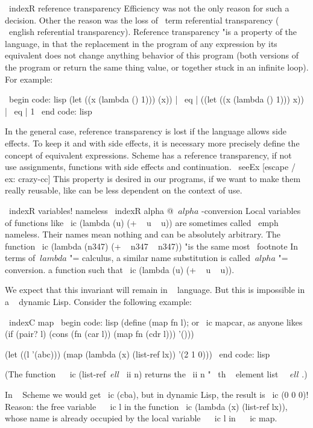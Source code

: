{{\ indexR {reference transparency}
Efficiency was not the only reason for such a decision. Other
the reason was the loss of \ term {referential transparency} ( \ english {referential
transparency}). Reference transparency "is a property of the language,
in that the replacement in the program of any expression by its equivalent does not change anything
behavior of this program (both versions of the program or return the same thing
value, or together stuck in an infinite loop). For example:

\ begin {code: lisp}
(let ((x (lambda () 1))) (x)) | \ eq | ((let ((x (lambda () 1))) x)) | \ eq | 1
\ end {code: lisp}

In the general case, reference transparency is lost if the language allows side
effects. To keep it and with side effects, it is necessary
more precisely define the concept of equivalent expressions. Scheme has a reference
transparency, if not ~ use assignments, functions with side effects
and continuation. \ seeEx [escape / ex: crazy-cc] This property is desired in our
programs, if we want to make them really reusable, like
can be less dependent on the context of use.

\ indexR {variables! nameless}
\ indexR {alpha @ $ \ alpha $ -conversion}
Local variables of functions like \ ic {(lambda (u) (+ ~ u ~ u))} are sometimes called
\ emph {nameless}. Their names mean nothing and can be absolutely
arbitrary. The function \ ic {(lambda (n347) (+ ~ n347 ~ n347))} "is the same
most \ footnote {In terms of $ \ lambda $ "= calculus, a similar name substitution is called
$ \ alpha $ "= conversion.} a function such that \ ic {(lambda (u) (+ ~ u ~ u))}.

We expect that this invariant will remain in ~ language. But this is impossible
in a ~ dynamic Lisp. Consider the following example:

\ indexC {map}
\ begin {code: lisp}
(define (map fn l); or \ ic {mapcar}, as anyone likes
  (if (pair? l)
      (cons (fn (car l)) (map fn (cdr l)))
      '()))

(let ((l '(abc)))
  (map (lambda (x) (list-ref lx))
       '(2 1 0)))
\ end {code: lisp}

(The function ~ \ ic {(list-ref $ \ ell $  \ ii {n})} returns the \ ii {n} "~ th ~ element
list ~ $ \ ell $ .)

In ~ Scheme we would get \ ic {(cba)}, but in dynamic Lisp, the result is
\ ic {(0 0 0)}! Reason: the free variable ~ \ ic {l} in the function \ ic {(lambda (x)
(list-ref lx))}, whose name is already occupied by the local variable ~ \ ic {l}
in ~ \ ic {map}.

}}
